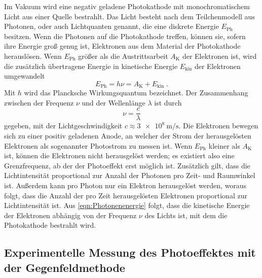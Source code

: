     Im Vakuum wird eine negativ geladene Photokathode mit monochromatischem Licht aus einer Quelle bestrahlt.
    Das Licht besteht nach dem Teilchenmodell aus Photonen,
    oder auch Lichtquanten genannt,
    die eine diskrete Energie $E_\text{Ph}$ besitzen.
    Wenn die Photonen auf die Photokathode treffen,
    können sie,
    sofern ihre Energie groß genug ist,
    Elektronen aus dem Material der Photokathode herauslösen.
    Wenn $E_\text{Ph}$ größer als die Austrittsarbeit $A_\text{K}$ der Elektronen ist,
    wird die zusätzlich übertragene Energie in kinetische Energie $E_\text{kin}$ der Elektronen umgewandelt
    \begin{equation}
        \label{eqn:Photonenenergie}
        E_\text{Ph} = h \nu = A_\text{K} + E_\text{kin} \; .
    \end{equation}
    Mit $h$ wird das Plancksche Wirkungsquantum bezeichnet.
    Der Zusammenhang zwischen der Frequenz $\nu$ und der Wellenlänge $\lambda$ ist durch
    \begin{equation*}
        \nu = \frac{c}{\lambda}
    \end{equation*}
    gegeben,
    mit der Lichtgeschwindigkeit $c \approx \SI{3e8}{\meter\per\second}$.
    Die Elektronen bewegen sich zu einer positiv geladenen Anode,
    an welcher der Strom der herausgelösten Elektronen als sogenannter Photostrom zu messen ist.
    Wenn $E_\text{Ph}$ kleiner als $A_\text{K}$ ist,
    können die Elektronen nicht herausgelöst werden;
    es existiert also eine Grenzfrequenz,
    ab der der Photoeffekt erst möglich ist.
    Zusätzlich gilt,
    dass die Lichtintensität proportional zur Anzahl der Photonen pro Zeit- und Raumwinkel ist.
    Außerdem kann pro Photon nur ein Elektron herausgelöst werden,
    woraus folgt,
    dass die Anzahl der pro Zeit herausgelösten Elektronen proportional zur Lichtintensität ist.
    Aus \autoref{eqn:Photonenenergie} folgt,
    dass die kinetische Energie der Elektronen abhängig von der Frequenz $\nu$ des Lichts ist,
    mit dem die Photokathode bestrahlt wird.

\subsection{Experimentelle Messung des Photoeffektes mit der Gegenfeldmethode}

